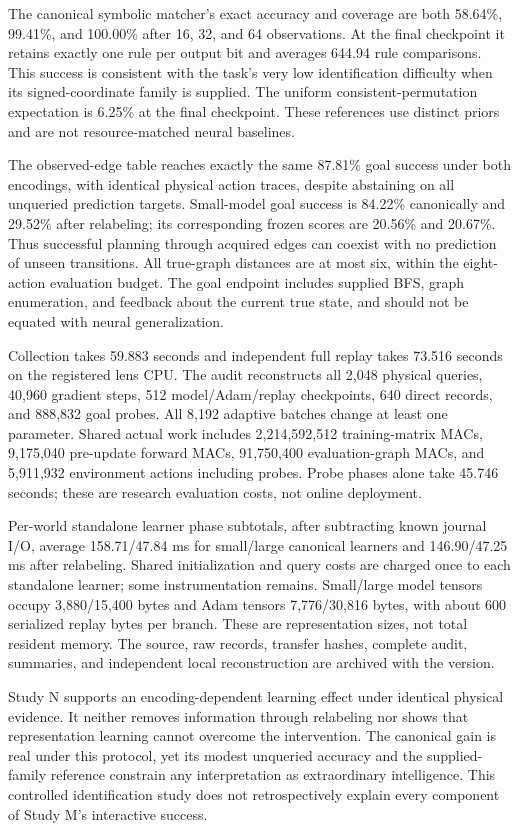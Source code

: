 \documentclass[11pt]{article}
\begin{document}
The canonical symbolic matcher's exact accuracy and coverage are both
58.64\%, 99.41\%, and 100.00\% after 16, 32, and 64 observations. At the final
checkpoint it retains exactly one rule per output bit and averages 644.94
rule comparisons. This success is consistent with the task's very low
identification difficulty when its signed-coordinate family is supplied.
The uniform consistent-permutation expectation is 6.25\% at the final
checkpoint. These references use distinct priors and are not resource-matched
neural baselines.

The observed-edge table reaches exactly the same 87.81\% goal success under
both encodings, with identical physical action traces, despite abstaining on
all unqueried prediction targets. Small-model goal success is 84.22\%
canonically and 29.52\% after relabeling; its corresponding frozen scores are
20.56\% and 20.67\%. Thus successful planning through acquired edges can
coexist with no prediction of unseen transitions. All true-graph distances
are at most six, within the eight-action evaluation budget. The goal endpoint
includes supplied BFS, graph enumeration, and feedback about the current
true state, and should not be equated with neural generalization.

Collection takes 59.883 seconds and independent full replay takes 73.516
seconds on the registered lens CPU. The audit reconstructs all 2,048 physical
queries, 40,960 gradient steps, 512 model/Adam/replay checkpoints, 640 direct
records, and 888,832 goal probes. All 8,192 adaptive batches change at least
one parameter. Shared actual work includes 2,214,592,512 training-matrix MACs,
9,175,040 pre-update forward MACs, 91,750,400 evaluation-graph MACs, and
5,911,932 environment actions including probes. Probe phases alone take
45.746 seconds; these are research evaluation costs, not online deployment.

Per-world standalone learner phase subtotals, after subtracting known journal
I/O, average 158.71/47.84 ms for small/large canonical learners and
146.90/47.25 ms after relabeling. Shared initialization and query costs are
charged once to each standalone learner; some instrumentation remains.
Small/large model tensors occupy 3,880/15,400 bytes and Adam tensors
7,776/30,816 bytes, with about 600 serialized replay bytes per branch.
These are representation sizes, not total resident memory. The source,
raw records, transfer hashes, complete audit, summaries, and independent
local reconstruction are archived with the version.

Study N supports an encoding-dependent learning effect under identical
physical evidence. It neither removes information through relabeling nor
shows that representation learning cannot overcome the intervention. The
canonical gain is real under this protocol, yet its modest unqueried accuracy
and the supplied-family reference constrain any interpretation as extraordinary
intelligence. This controlled identification study does not retrospectively
explain every component of Study M's interactive success.
\end{document}
